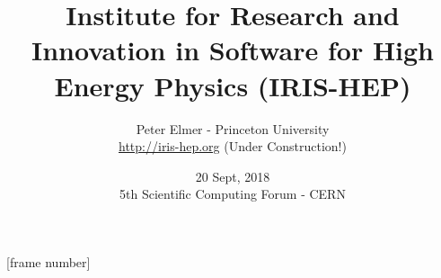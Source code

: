 \documentclass{beamer}
\title{Institute for Research and Innovation in Software for High Energy Physics (IRIS-HEP)}
\author{Peter Elmer - Princeton University \\
        \url{http://iris-hep.org} (Under Construction!)}
\date{20 Sept, 2018 \\ 5th Scientific Computing Forum - CERN}
\begin{document}
\maketitle



%
%

[frame number]







%
\end{document}
